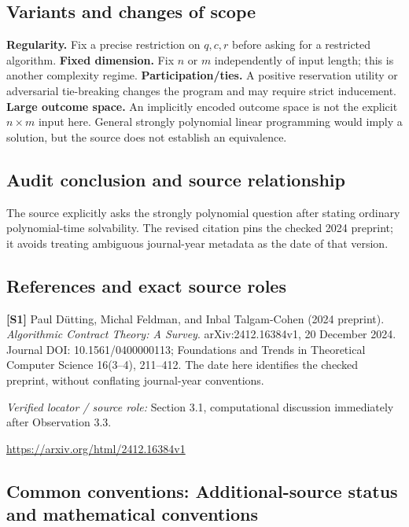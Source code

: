\documentclass[11pt,a4paper]{article}
\begin{document}
\subsection*{Variants and changes of scope}

\textbf{Regularity.} Fix a precise restriction on $q,c,r$ before asking for a restricted algorithm. \textbf{Fixed dimension.} Fix $n$ or $m$ independently of input length; this is another complexity regime. \textbf{Participation/ties.} A positive reservation utility or adversarial tie-breaking changes the program and may require strict inducement. \textbf{Large outcome space.} An implicitly encoded outcome space is not the explicit $n\times m$ input here. General strongly polynomial linear programming would imply a solution, but the source does not establish an equivalence.

\subsection*{Audit conclusion and source relationship}

The source explicitly asks the strongly polynomial question after stating ordinary polynomial-time solvability. The revised citation pins the checked 2024 preprint; it avoids treating ambiguous journal-year metadata as the date of that version.

\subsection*{References and exact source roles}

{\footnotesize\raggedright
\par\noindent\textbf{[S1]} Paul D\"utting, Michal Feldman, and Inbal Talgam-Cohen (2024 preprint). \emph{Algorithmic Contract Theory: A Survey}. arXiv:2412.16384v1, 20 December 2024. Journal DOI: 10.1561/0400000113; Foundations and Trends in Theoretical Computer Science 16(3--4), 211--412. The date here identifies the checked preprint, without conflating journal-year conventions.\par \textit{Verified locator / source role:} Section 3.1, computational discussion immediately after Observation 3.3.\par \url{https://arxiv.org/html/2412.16384v1}\par\smallskip
}

\subsection*{Common conventions: Additional-source status and mathematical conventions}
\end{document}

